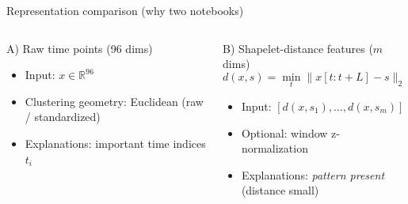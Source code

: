 \documentclass[aspectratio=169]{beamer}
\begin{document}
\begin{frame}{Representation comparison (why two notebooks)}
  \begin{columns}[T,onlytextwidth]
    \begin{block}{A) Raw time points (96 dims)}
      \begin{itemize}
        \item Input: $x \in \mathbb{R}^{96}$
        \item Clustering geometry: Euclidean (raw / standardized)
        \item Explanations: important time indices $t_i$
      \end{itemize}
    \end{block}

    \begin{block}{B) Shapelet-distance features ($m$ dims)}
      \vspace{-0.4em}
      \[
        d(x, s)=\min_{t} \lVert x[t:t+L]-s\rVert_2
      \]
      \vspace{-0.9em}
      \begin{itemize}
        \item Input: $[d(x,s_1),\ldots,d(x,s_m)]$
        \item Optional: window z-normalization
        \item Explanations: \emph{pattern present} (distance small)
      \end{itemize}
    \end{block}
  \end{columns}
\end{frame}
\end{document}
